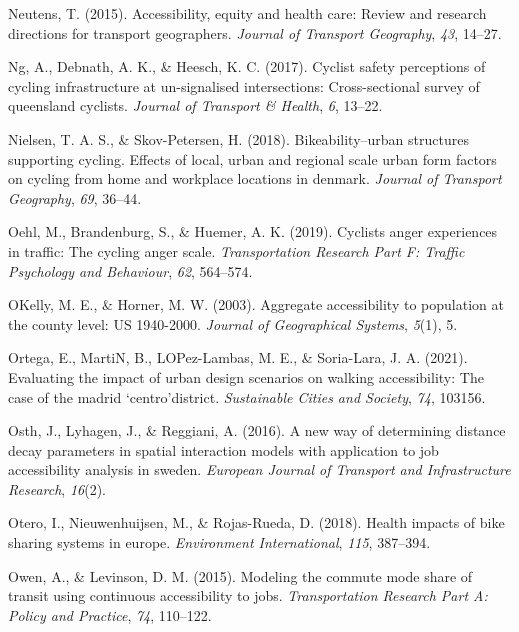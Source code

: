 \documentclass[
11pt, %
oneside, %
english, %
singlespacing, %
]{macthesis} %
\newlength{\cslhangindent}
\newenvironment{CSLReferences}[2] %
{\begin{list}{}{%
	\setlength{\itemindent}{0pt}
	\setlength{\leftmargin}{0pt}
	\setlength{\parsep}{0pt}
	\ifodd #1
	\setlength{\leftmargin}{\cslhangindent}
	\setlength{\itemindent}{-1\cslhangindent}
	\fi
	\setlength{\itemsep}{#2\baselineskip}}}
{\end{list}}
\begin{document}
\begin{CSLReferences}{1}{0}
Neutens, T. (2015). Accessibility, equity and health care: Review and research directions for transport geographers. \emph{Journal of Transport Geography}, \emph{43}, 14--27.

Ng, A., Debnath, A. K., \& Heesch, K. C. (2017). Cyclist safety perceptions of cycling infrastructure at un-signalised intersections: Cross-sectional survey of queensland cyclists. \emph{Journal of Transport \& Health}, \emph{6}, 13--22.

Nielsen, T. A. S., \& Skov-Petersen, H. (2018). Bikeability--urban structures supporting cycling. Effects of local, urban and regional scale urban form factors on cycling from home and workplace locations in denmark. \emph{Journal of Transport Geography}, \emph{69}, 36--44.

Oehl, M., Brandenburg, S., \& Huemer, A. K. (2019). Cyclists anger experiences in traffic: The cycling anger scale. \emph{Transportation Research Part F: Traffic Psychology and Behaviour}, \emph{62}, 564--574.

OKelly, M. E., \& Horner, M. W. (2003). Aggregate accessibility to population at the county level: US 1940-2000. \emph{Journal of Geographical Systems}, \emph{5}(1), 5.

Ortega, E., MartiN, B., LOPez-Lambas, M. E., \& Soria-Lara, J. A. (2021). Evaluating the impact of urban design scenarios on walking accessibility: The case of the madrid `centro'district. \emph{Sustainable Cities and Society}, \emph{74}, 103156.

Osth, J., Lyhagen, J., \& Reggiani, A. (2016). A new way of determining distance decay parameters in spatial interaction models with application to job accessibility analysis in sweden. \emph{European Journal of Transport and Infrastructure Research}, \emph{16}(2).

Otero, I., Nieuwenhuijsen, M., \& Rojas-Rueda, D. (2018). Health impacts of bike sharing systems in europe. \emph{Environment International}, \emph{115}, 387--394.

Owen, A., \& Levinson, D. M. (2015). Modeling the commute mode share of transit using continuous accessibility to jobs. \emph{Transportation Research Part A: Policy and Practice}, \emph{74}, 110--122.


\end{CSLReferences}
\end{document}
